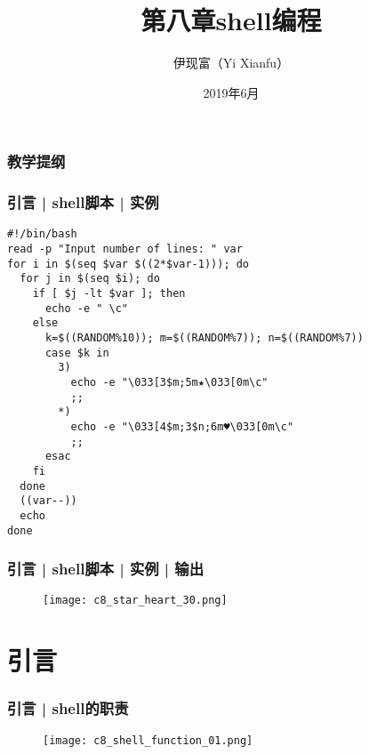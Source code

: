 



\title[shell编程]{第八章\quad shell编程}
\author[Yixf]{伊现富（Yi Xianfu）}
\date{2019年6月}


\begin{frame}
  \titlepage
\end{frame}

\begin{frame}[plain,label=current]
  \frametitle{教学提纲}
  \setcounter{tocdepth}{3}
  \begin{multicols}{2}
    \tableofcontents
  \end{multicols}
\end{frame}

\begin{frame}[fragile]
  \frametitle{引言 | shell脚本 | 实例}
  \vspace{-0.5em}
\begin{lstlisting}[basicstyle=\scriptsize\tt]
#!/bin/bash
read -p "Input number of lines: " var
for i in $(seq $var $((2*$var-1))); do
  for j in $(seq $i); do
    if [ $j -lt $var ]; then
      echo -e " \c"
    else
      k=$((RANDOM%10)); m=$((RANDOM%7)); n=$((RANDOM%7))
      case $k in
        3)
          echo -e "\033[3$m;5m★\033[0m\c"
          ;;
        *)
          echo -e "\033[4$m;3$n;6m♥\033[0m\c"
          ;;
      esac
    fi
  done
  ((var--))
  echo
done
\end{lstlisting}
\end{frame}

\begin{frame}
  \frametitle{引言 | shell脚本 | 实例 | 输出}
  \begin{figure}
    \centering
    \texttt{[image: c8\_star\_heart\_30.png]}
  \end{figure}
\end{frame}

\section{引言}
\begin{frame}
  \frametitle{引言 | shell的职责}
  \begin{figure}
    \centering
    \texttt{[image: c8\_shell\_function\_01.png]}
  \end{figure}
\end{frame}

